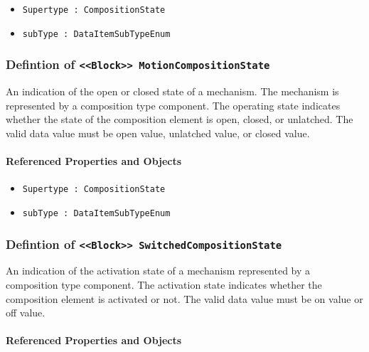 \begin{itemize}
\item \texttt{Supertype : CompositionState}

\item \texttt{subType : DataItemSubTypeEnum}

\end{itemize}
\FloatBarrier
\subsubsection{Defintion of \texttt{<<Block>> MotionCompositionState}}
  \label{type:MotionCompositionState}

\FloatBarrier

An indication of the open or closed state of a mechanism.   The mechanism is represented by a composition type component. 
 The operating state indicates whether the state of the composition element is open, closed, or unlatched.   
 The valid data value must be open value, unlatched value, or closed value.

\FloatBarrier
\paragraph{Referenced Properties and Objects}

\begin{itemize}
\item \texttt{Supertype : CompositionState}

\item \texttt{subType : DataItemSubTypeEnum}

\end{itemize}
\FloatBarrier
\subsubsection{Defintion of \texttt{<<Block>> SwitchedCompositionState}}
  \label{type:SwitchedCompositionState}

\FloatBarrier

An indication of the activation state of a mechanism represented by a composition type component.
 The activation state indicates whether the composition element is activated or not.
 The valid data value must be on value or off value.

\FloatBarrier
\paragraph{Referenced Properties and Objects}

